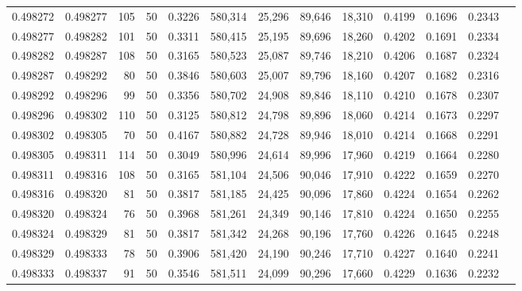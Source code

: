 \begin{tabular}{rrrrrrrrrrrrr}
0.498272 & 0.498277 &   105 &  50 &                                     0.3226 & 580,314 &  25,296 &  89,646 &  18,310 & 0.4199 & 0.1696 & 0.2343 \\
0.498277 & 0.498282 &   101 &  50 &                                     0.3311 & 580,415 &  25,195 &  89,696 &  18,260 & 0.4202 & 0.1691 & 0.2334 \\
0.498282 & 0.498287 &   108 &  50 &                                     0.3165 & 580,523 &  25,087 &  89,746 &  18,210 & 0.4206 & 0.1687 & 0.2324 \\
0.498287 & 0.498292 &    80 &  50 &                                     0.3846 & 580,603 &  25,007 &  89,796 &  18,160 & 0.4207 & 0.1682 & 0.2316 \\
0.498292 & 0.498296 &    99 &  50 &                                     0.3356 & 580,702 &  24,908 &  89,846 &  18,110 & 0.4210 & 0.1678 & 0.2307 \\
0.498296 & 0.498302 &   110 &  50 &                                     0.3125 & 580,812 &  24,798 &  89,896 &  18,060 & 0.4214 & 0.1673 & 0.2297 \\
0.498302 & 0.498305 &    70 &  50 &                                     0.4167 & 580,882 &  24,728 &  89,946 &  18,010 & 0.4214 & 0.1668 & 0.2291 \\
0.498305 & 0.498311 &   114 &  50 &                                     0.3049 & 580,996 &  24,614 &  89,996 &  17,960 & 0.4219 & 0.1664 & 0.2280 \\
0.498311 & 0.498316 &   108 &  50 &                                     0.3165 & 581,104 &  24,506 &  90,046 &  17,910 & 0.4222 & 0.1659 & 0.2270 \\
0.498316 & 0.498320 &    81 &  50 &                                     0.3817 & 581,185 &  24,425 &  90,096 &  17,860 & 0.4224 & 0.1654 & 0.2262 \\
0.498320 & 0.498324 &    76 &  50 &                                     0.3968 & 581,261 &  24,349 &  90,146 &  17,810 & 0.4224 & 0.1650 & 0.2255 \\
0.498324 & 0.498329 &    81 &  50 &                                     0.3817 & 581,342 &  24,268 &  90,196 &  17,760 & 0.4226 & 0.1645 & 0.2248 \\
0.498329 & 0.498333 &    78 &  50 &                                     0.3906 & 581,420 &  24,190 &  90,246 &  17,710 & 0.4227 & 0.1640 & 0.2241 \\
0.498333 & 0.498337 &    91 &  50 &                                     0.3546 & 581,511 &  24,099 &  90,296 &  17,660 & 0.4229 & 0.1636 & 0.2232 \\

\end{tabular}
